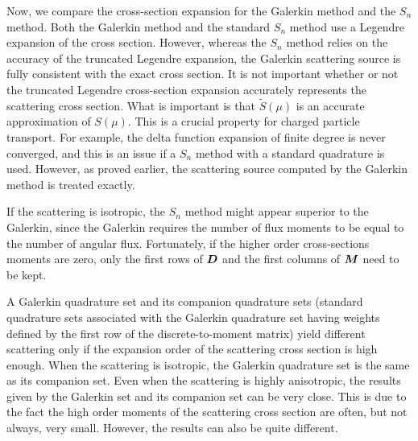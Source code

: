 Now, we compare the cross-section expansion for the Galerkin method and
the $S_n$ method. Both the Galerkin method and the standard $S_n$ method use
a Legendre expansion of the cross section. However, whereas the $S_n$ method
relies on the accuracy of the truncated Legendre expansion, the Galerkin 
scattering source is fully consistent with the exact cross section. It is not
important whether or not the truncated Legendre cross-section expansion 
accurately represents the scattering cross section. What is important is that
$\tilde{S}(\mu)$ is an accurate approximation of $S(\mu)$. This is a crucial 
property for charged particle transport. For example, the delta
function expansion of finite degree is never converged, and this is an issue if a 
$S_n$ method with a standard quadrature is used. However, as proved earlier, 
the scattering source computed by the Galerkin method is treated exactly.

If the scattering is isotropic, the $S_n$ method might appear superior to the
Galerkin, since the Galerkin requires the number of flux moments to be equal
to the number of angular flux. Fortunately, if the higher order cross-sections
moments are zero, only the first rows of $\boldsymbol{D}$ and the first columns of
$\boldsymbol{M}$ need to be kept.

A Galerkin quadrature set and its companion quadrature sets (standard
quadrature sets associated with the Galerkin quadrature set having weights
defined by the first row of the discrete-to-moment matrix) yield different
scattering only
if the expansion order of the scattering cross section is high enough. When the 
scattering is isotropic, the Galerkin quadrature set is the same as its
companion set. Even when the scattering is highly anisotropic, the results
given by the Galerkin set and its companion set can be very close. This is due
to the fact the high order moments of the scattering cross section are often,
but not always, very small. However, the results can also be quite different.
